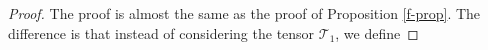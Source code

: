 \documentclass[letter]{amsart}
\theoremstyle{definition}
\theoremstyle{remark}
\begin{document}
\begin{proof}
	The proof is almost the same as the proof of Proposition \ref{f-prop}. The difference is that instead of considering the tensor $\mathcal{T}_1$, we define 

\end{proof}
\end{document}
